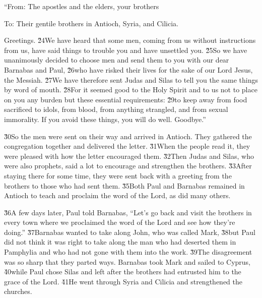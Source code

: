 ``From: The apostles and the elders, your brothers

To: Their gentile brothers in Antioch, Syria, and Cilicia.

Greetings. \v{24}We have heard that some men, coming from us without instructions from us, have said things to trouble you and have unsettled you. \v{25}So we have unanimously decided to choose men and send them to you with our dear Barnabas and Paul, \v{26}who have risked their lives for the sake of our Lord Jesus, the Messiah. \v{27}We have therefore sent Judas and Silas to tell you the same things by word of mouth. \v{28}For it seemed good to the Holy Spirit and to us not to place on you any burden but these essential requirements: \v{29}to keep away from food sacrificed to idols, from blood, from anything strangled, and from sexual immorality. If you avoid these things, you will do well. Goodbye.''

\v{30}So the men were sent on their way and arrived in Antioch. They gathered the congregation together and delivered the letter. \v{31}When the people read it, they were pleased with how the letter encouraged them. \v{32}Then Judas and Silas, who were also prophets, said a lot to encourage and strengthen the brothers. \v{33}After staying there for some time, they were sent back with a greeting from the brothers to those who had sent them. \v{35}Both Paul and Barnabas remained in Antioch to teach and proclaim the word of the Lord, as did many others.

\v{36}A few days later, Paul told Barnabas, ``Let's go back and visit the brothers in every town where we proclaimed the word of the Lord and see how they're doing.'' \v{37}Barnabas wanted to take along John, who was called Mark, \v{38}but Paul did not think it was right to take along the man who had deserted them in Pamphylia and who had not gone with them into the work. \v{39}The disagreement was so sharp that they parted ways. Barnabas took Mark and sailed to Cyprus, \v{40}while Paul chose Silas and left after the brothers had entrusted him to the grace of the Lord. \v{41}He went through Syria and Cilicia and strengthened the churches.

